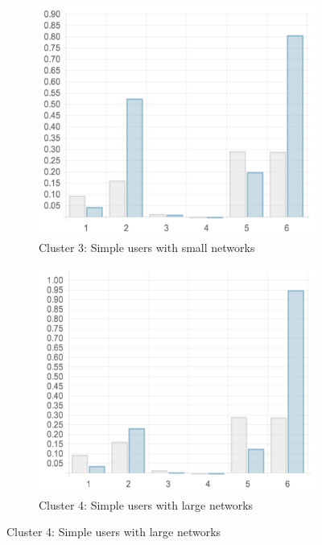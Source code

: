 \begin{figure}
  \begin{subfigure}[t]{0.45\textwidth}
    \includegraphics[width=\textwidth]{Figures/clusterings/confluence-post/cluster3-chart}
    \caption{Cluster 3: Simple users with small networks}
    \label{fig:cluster3-chart}
  \end{subfigure}
  \hfill
  \begin{subfigure}[t]{0.45\textwidth}
    \includegraphics[width=\textwidth]{Figures/clusterings/confluence-post/cluster4-chart}
    \caption{Cluster 4: Simple users with large networks}
    \label{fig:cluster4-chart}
  \end{subfigure}


\end{figure}
